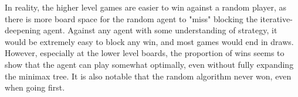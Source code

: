 \documentclass[12pt]{article}
\begin{document}
\begin{center}
\end{center}

In reality, the higher level games are easier to win against a random player, as there is more board space for the random agent to "miss" blocking the iterative-deepening agent. Against any agent with some understanding of strategy, it would be extremely easy to block any win, and most games would end in draws. However, especially at the lower level boards, the proportion of wins seems to show that the agent can play somewhat optimally, even without fully expanding the minimax tree. It is also notable that the random algorithm never won, even when going first.
\end{document}
